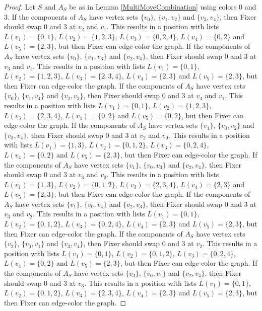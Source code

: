 \documentclass[12pt]{amsart}
\theoremstyle{plain}
\theoremstyle{definition}
\theoremstyle{remark}
\begin{document}
\begin{proof}
Let $S$ and $A_S$ be as in Lemma \ref{MultiMoveCombination} using colors $0$ and $3$. If the components of $A_S$ have vertex sets $\{v_0\}$, $\{v_1, v_2\}$ and $\{v_3, v_4\}$, then Fixer should swap 0 and 3 at $v_2$ and $v_1$. This results in a position with lists $L(v_1) = \{0, 1\}$, $L(v_2) = \{1, 2, 3\}$, $L(v_3) = \{0, 2, 4\}$, $L(v_4) = \{0, 2\}$ and $L(v_5) = \{2, 3\}$, but then Fixer can edge-color the graph.
If the components of $A_S$ have vertex sets $\{v_0\}$, $\{v_1, v_3\}$ and $\{v_2, v_4\}$, then Fixer should swap 0 and 3 at $v_3$ and $v_1$. This results in a position with lists $L(v_1) = \{0, 1\}$, $L(v_2) = \{1, 2, 3\}$, $L(v_3) = \{2, 3, 4\}$, $L(v_4) = \{2, 3\}$ and $L(v_5) = \{2, 3\}$, but then Fixer can edge-color the graph.
If the components of $A_S$ have vertex sets $\{v_0\}$, $\{v_1, v_4\}$ and $\{v_2, v_3\}$, then Fixer should swap 0 and 3 at $v_4$ and $v_1$. This results in a position with lists $L(v_1) = \{0, 1\}$, $L(v_2) = \{1, 2, 3\}$, $L(v_3) = \{2, 3, 4\}$, $L(v_4) = \{0, 2\}$ and $L(v_5) = \{0, 2\}$, but then Fixer can edge-color the graph.
If the components of $A_S$ have vertex sets $\{v_1\}$, $\{v_0, v_2\}$ and $\{v_3, v_4\}$, then Fixer should swap 0 and 3 at $v_2$ and $v_0$. This results in a position with lists $L(v_1) = \{1, 3\}$, $L(v_2) = \{0, 1, 2\}$, $L(v_3) = \{0, 2, 4\}$, $L(v_4) = \{0, 2\}$ and $L(v_5) = \{2, 3\}$, but then Fixer can edge-color the graph.
If the components of $A_S$ have vertex sets $\{v_1\}$, $\{v_0, v_3\}$ and $\{v_2, v_4\}$, then Fixer should swap 0 and 3 at $v_3$ and $v_0$. This results in a position with lists $L(v_1) = \{1, 3\}$, $L(v_2) = \{0, 1, 2\}$, $L(v_3) = \{2, 3, 4\}$, $L(v_4) = \{2, 3\}$ and $L(v_5) = \{2, 3\}$, but then Fixer can edge-color the graph.
If the components of $A_S$ have vertex sets $\{v_1\}$, $\{v_0, v_4\}$ and $\{v_2, v_3\}$, then Fixer should swap 0 and 3 at $v_3$ and $v_2$. This results in a position with lists $L(v_1) = \{0, 1\}$, $L(v_2) = \{0, 1, 2\}$, $L(v_3) = \{0, 2, 4\}$, $L(v_4) = \{2, 3\}$ and $L(v_5) = \{2, 3\}$, but then Fixer can edge-color the graph.
If the components of $A_S$ have vertex sets $\{v_2\}$, $\{v_0, v_1\}$ and $\{v_3, v_4\}$, then Fixer should swap 0 and 3 at $v_2$. This results in a position with lists $L(v_1) = \{0, 1\}$, $L(v_2) = \{0, 1, 2\}$, $L(v_3) = \{0, 2, 4\}$, $L(v_4) = \{0, 2\}$ and $L(v_5) = \{2, 3\}$, but then Fixer can edge-color the graph.
If the components of $A_S$ have vertex sets $\{v_3\}$, $\{v_0, v_1\}$ and $\{v_2, v_4\}$, then Fixer should swap 0 and 3 at $v_3$. This results in a position with lists $L(v_1) = \{0, 1\}$, $L(v_2) = \{0, 1, 2\}$, $L(v_3) = \{2, 3, 4\}$, $L(v_4) = \{2, 3\}$ and $L(v_5) = \{2, 3\}$, but then Fixer can edge-color the graph.

\end{proof}
\end{document}
